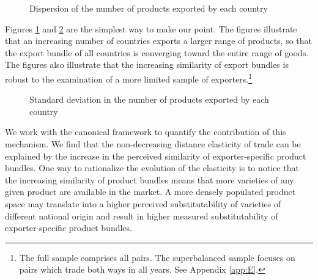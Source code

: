 \documentclass[12pt,twoside,a4paper,notitlepage]{article}
\begin{document}
\begin{figure}[h!]
	\caption{Dispersion of the number of products exported by each country \label{fig:vioplot}}
	\begin{center}
		\setlength{\fboxrule}{1pt} %
		\setlength{\fboxsep}{.1in} %
	\end{center}
\end{figure}

Figures \ref{fig:vioplot} and \ref{fig:fall_of_sd} are the simplest way to make our point. 
The figures illustrate that an increasing number of countries exports a larger range of products, so that the export bundle of all countries is converging toward the entire range of goods.
The figures also illustrate that the increasing similarity of export bundles is robust to the examination of a more limited sample of exporters.\footnote{The full sample comprises all pairs. The superbalanced sample focuses on pairs which trade both ways in all years. See Appendix \ref{app:E}.} 

\begin{figure}[h!]
	\caption{Standard deviation in the number of products exported by each country \label{fig:fall_of_sd}}
	\begin{center}
		\setlength{\fboxrule}{1pt} %
		\setlength{\fboxsep}{.1in} %
	\end{center}
\end{figure}

We work with the canonical \cite{Anderson2003} framework to quantify the contribution of this mechanism. 
We find that the non-decreasing distance elasticity of trade can be explained by the increase in the perceived similarity of exporter-specific product bundles. 
One way to rationalize the evolution of the elasticity is to notice that the increasing similarity of product bundles means that more varieties of any given product are available in the market. 
A more densely populated product space may translate into a higher perceived substitutability of varieties of different national origin and result in higher measured substitutability of exporter-specific product bundles.
\end{document}
